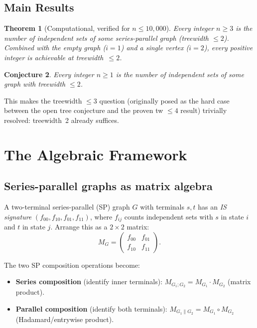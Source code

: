 \documentclass[11pt,a4paper]{article}
\newtheorem{theorem}{Theorem}
\newtheorem{conjecture}[theorem]{Conjecture}
\theoremstyle{definition}
\theoremstyle{remark}
\begin{document}
\subsection{Main Results}

\begin{theorem}[Computational, verified for $n \leq 10{,}000$]
Every integer $n \geq 3$ is the number of independent sets of some series-parallel graph (treewidth $\leq 2$). Combined with the empty graph ($i = 1$) and a single vertex ($i = 2$), every positive integer is achievable at treewidth~$\leq 2$.
\end{theorem}

\begin{conjecture}
Every integer $n \geq 1$ is the number of independent sets of some graph with treewidth $\leq 2$.
\end{conjecture}

This makes the treewidth $\leq 3$ question (originally posed as the hard case between the open tree conjecture and the proven tw $\leq 4$ result) trivially resolved: treewidth~2 already suffices.

\section{The Algebraic Framework}

\subsection{Series-parallel graphs as matrix algebra}

A two-terminal series-parallel (SP) graph $G$ with terminals $s, t$ has an \emph{IS signature} $(f_{00}, f_{10}, f_{01}, f_{11})$, where $f_{ij}$ counts independent sets with $s$ in state $i$ and $t$ in state $j$. Arrange this as a $2 \times 2$ matrix:
\[
M_G = \begin{pmatrix} f_{00} & f_{01} \\ f_{10} & f_{11} \end{pmatrix}.
\]

The two SP composition operations become:
\begin{itemize}
  \item \textbf{Series composition} (identify inner terminals): $M_{G_1 ; G_2} = M_{G_1} \cdot M_{G_2}$ (matrix product).
  \item \textbf{Parallel composition} (identify both terminals): $M_{G_1 \| G_2} = M_{G_1} \circ M_{G_2}$ (Hadamard/entrywise product).
\end{itemize}
\end{document}
